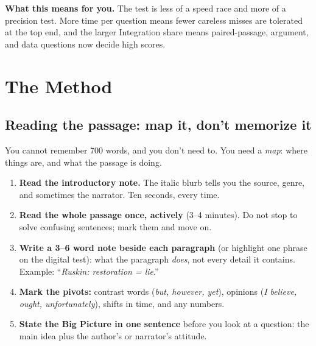 \documentclass[11pt]{article}
\begin{document}
\textbf{What this means for you.} The test is less of a speed race and more of a precision test. More time per question means fewer careless misses are tolerated at the top end, and the larger Integration share means paired-passage, argument, and data questions now decide high scores.

\section{The Method}

\subsection{Reading the passage: map it, don't memorize it}
You cannot remember 700 words, and you don't need to. You need a \emph{map}: where things are, and what the passage is doing.

\begin{enumerate}
  \item \textbf{Read the introductory note.} The italic blurb tells you the source, genre, and sometimes the narrator. Ten seconds, every time.
  \item \textbf{Read the whole passage once, actively} (3--4 minutes). Do not stop to solve confusing sentences; mark them and move on.
  \item \textbf{Write a 3--6 word note beside each paragraph} (or highlight one phrase on the digital test): what the paragraph \emph{does}, not every detail it contains. Example: ``\emph{Ruskin: restoration = lie}.''
  \item \textbf{Mark the pivots:} contrast words (\emph{but, however, yet}), opinions (\emph{I believe, ought, unfortunately}), shifts in time, and any numbers.
  \item \textbf{State the Big Picture in one sentence} before you look at a question: the main idea plus the author's or narrator's attitude.
\end{enumerate}
\end{document}
